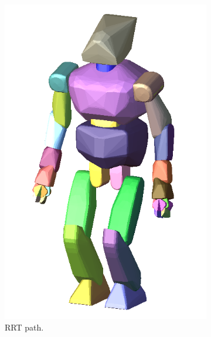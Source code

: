\begin{figure}
\begin{subfigure}{0.48\columnwidth}
    \includegraphics[width = \columnwidth]
                    {src/chap3-optimal-motion-planning/figure/hrp2-convex-hull.png}
    \caption{RRT path.}
    \label{simple-path-sola}
  \end{subfigure}
  \begin{subfigure}{0.48\columnwidth}
    \centering

\end{subfigure}
\end{figure}
